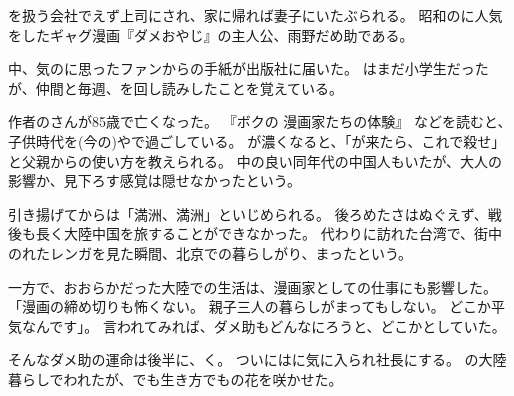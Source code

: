 \documentclass[12pt]{article}
\begin{document}
\begin{CJK}{UTF8}{ipxm}

    を扱う会社でえず上司にされ、家に帰れば妻子にいたぶられる。
    昭和のに人気をしたギャグ漫画『ダメおやじ』の主人公、雨野だめ助である。
    
    中、気のに思ったファンからの手紙が出版社に届いた。
    はまだ小学生だったが、仲間と毎週、を回し読みしたことを覚えている。

    作者のさんが85歳で亡くなった。
    『ボクの 漫画家たちの体験』 などを読むと、子供時代を(今の)やで過ごしている。
    が濃くなると、「が来たら、これで殺せ」と父親からの使い方を教えられる。
    中の良い同年代の中国人もいたが、大人の影響か、見下ろす感覚は隠せなかったという。

    引き揚げてからは「満洲、満洲」といじめられる。
    後ろめたさはぬぐえず、戦後も長く大陸中国を旅することができなかった。
    代わりに訪れた台湾で、街中のれたレンガを見た瞬間、北京での暮らしがり、まったという。

    一方で、おおらかだった大陸での生活は、漫画家としての仕事にも影響した。
    「漫画の締め切りも怖くない。
    親子三人の暮らしがまってもしない。
    どこか平気なんです」。
    言われてみれば、ダメ助もどんなにろうと、どこかとしていた。

    そんなダメ助の運命は後半に、く。
    ついにはに気に入られ社長にする。
    の大陸暮らしでわれたが、でも生き方でもの花を咲かせた。

\end{CJK}
\end{document}
